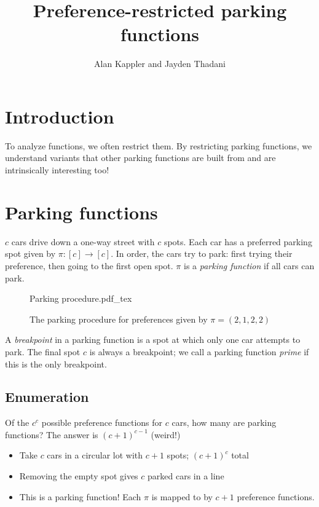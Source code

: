 \documentclass[thesis]{hmcposter}
\author{Alan Kappler and Jayden Thadani}
\title{Preference-restricted parking functions}
\newcommand{\incfig}[1]{%
    \def\svgwidth{0.8 \columnwidth}
    {#1.pdf_tex}
}
\begin{document}
\begin{poster}

\section{Introduction}

To analyze functions, we often restrict them. By restricting parking functions, we understand variants that other parking functions are built from and are intrinsically interesting too!

\section{Parking functions}%

$c$ cars drive down a one-way street with $c$ spots. Each car has a preferred parking spot given by $\pi:[c] \to [c]$. In order, the cars try to park: first trying their preference, then going to the first open spot. $\pi$ is a \emph{parking function} if all cars can park.

\begin{figure}
    \centering
    \incfig{Parking procedure}
    \caption{The parking procedure for preferences given by $\pi = (2, 1, 2, 2)$}
    \label{fig:parking-procedure}
\end{figure}

A \emph{breakpoint} in a parking function is a spot at which only one car attempts to park. The final spot $c$ is always a breakpoint; we call a parking function \emph{prime} if this is the only breakpoint.

\subsection{Enumeration}

Of the $c^c$ possible preference functions for $c$ cars, how many are parking functions? The answer is $(c+1)^{c-1}$ (weird!)
\begin{itemize}
\item Take $c$ cars in a circular lot with $c+1$ spots; $(c+1)^c$ total
\item Removing the empty spot gives $c$ parked cars in a line
\item This is a parking function! Each $\pi$ is mapped to by $c+1$ preference functions. 
\end{itemize}


\end{poster}
\end{document}
